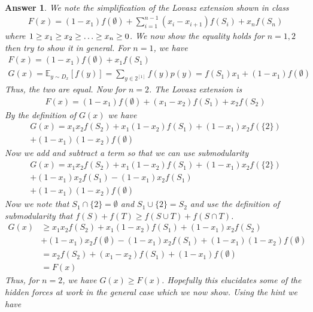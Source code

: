 \documentclass[12pt]{article}
\theoremstyle{colon}
\newtheorem*{answer}{Answer}
\begin{document}
\begin{answer}
  We note the simplification of the Lovasz extension shown in class
  \begin{gather*}
    F(x) = (1-x_1)f(\emptyset) + \sum_{i=1}^{n-1} (x_i - x_{i+1})f(S_i) + x_n f(S_n)
  \end{gather*}
  where $1 \geq x_1 \geq x_2 \geq \mathellipsis \geq x_n \geq 0$. We now show the equality holds for $n = 1,2$ then try to show it in general. For $n=1$, we have
  \begin{gather*}
    F(x) = (1-x_1)f(\emptyset) + x_1 f(S_1) \\
    G(x) = \mathbb{E}_{y \sim D_x} [f(y)] = \sum_{y \in 2^{[1]}} f(y)p(y) = f(S_1)x_1 + (1-x_1)f(\emptyset)
  \end{gather*}
  Thus, the two are equal. Now for $n=2$. The Lovasz extension is
  \begin{gather*}
    F(x) = (1-x_1)f(\emptyset) + (x_1 - x_2) f(S_1) + x_2 f(S_2)
  \end{gather*}
  By the definition of $G(x)$ we have
  \begin{gather*}
    G(x) = x_1 x_2 f(S_2) + x_1 (1-x_2) f(S_1) + (1-x_1)x_2 f(\{2\}) \\
    + (1-x_1)(1-x_2)f(\emptyset)
  \end{gather*}
  Now we add and subtract a term so that we can use submodularity
  \begin{gather*}
    G(x) = x_1 x_2 f(S_2) + x_1 (1-x_2) f(S_1) + (1-x_1)x_2 f(\{2\}) \\
    + (1-x_1)x_2 f(S_1) - (1-x_1)x_2 f(S_1) \\
    + (1-x_1)(1-x_2)f(\emptyset)
  \end{gather*}
  Now we note that $S_1 \cap \{2\} = \emptyset$ and $S_1 \cup \{2\} = S_2$ and use the definition of submodularity that $f(S) + f(T) \geq f(S \cup T) + f(S \cap T)$.
  \begin{align*}
    G(x) &\geq x_1 x_2 f(S_2) + x_1 (1-x_2) f(S_1) + (1-x_1)x_2 f(S_2) \\
      &+ (1-x_1)x_2 f(\emptyset) - (1-x_1)x_2 f(S_1) + (1-x_1)(1-x_2) f(\emptyset) \\
      &= x_2 f(S_2) + (x_1 - x_2) f(S_1) + (1-x_1) f(\emptyset) \\
      &= F(x)
  \end{align*}
  Thus, for $n = 2$, we have $G(x) \geq F(x)$. Hopefully this elucidates some of the hidden forces at work in the general case which we now show. Using the hint we have
  \begin{gather*}

\end{gather*}
\end{answer}
\end{document}
